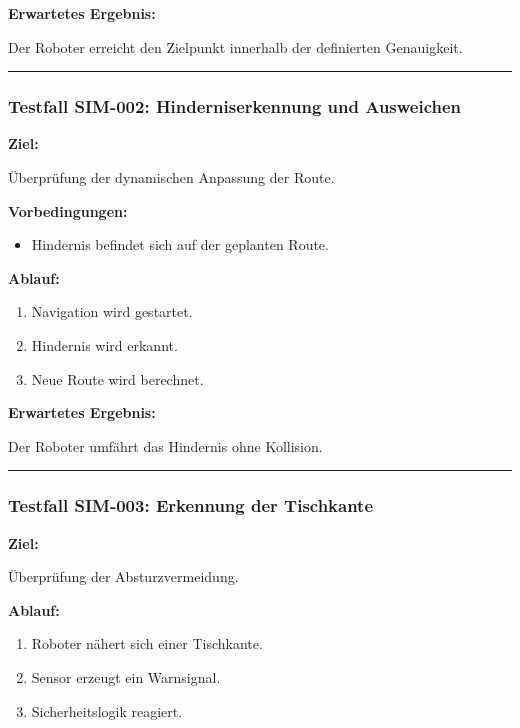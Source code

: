 \documentclass[
]{article}
\providecommand{\tightlist}{%
  \setlength{\itemsep}{0pt}\setlength{\parskip}{0pt}}
\begin{document}
\textbf{Erwartetes Ergebnis:}

Der Roboter erreicht den Zielpunkt innerhalb der definierten
Genauigkeit.

\begin{center}\rule{0.5\linewidth}{0.5pt}\end{center}

\subsubsection{Testfall SIM-002: Hinderniserkennung und
Ausweichen}\label{testfall-sim-002-hinderniserkennung-und-ausweichen}

\textbf{Ziel:}

Überprüfung der dynamischen Anpassung der Route.

\textbf{Vorbedingungen:}

\begin{itemize}
\tightlist
\item
  Hindernis befindet sich auf der geplanten Route.
\end{itemize}

\textbf{Ablauf:}

\begin{enumerate}
\def\labelenumi{\arabic{enumi}.}
\tightlist
\item
  Navigation wird gestartet.
\item
  Hindernis wird erkannt.
\item
  Neue Route wird berechnet.
\end{enumerate}

\textbf{Erwartetes Ergebnis:}

Der Roboter umfährt das Hindernis ohne Kollision.

\begin{center}\rule{0.5\linewidth}{0.5pt}\end{center}

\subsubsection{Testfall SIM-003: Erkennung der
Tischkante}\label{testfall-sim-003-erkennung-der-tischkante}

\textbf{Ziel:}

Überprüfung der Absturzvermeidung.

\textbf{Ablauf:}

\begin{enumerate}
\def\labelenumi{\arabic{enumi}.}
\tightlist
\item
  Roboter nähert sich einer Tischkante.
\item
  Sensor erzeugt ein Warnsignal.
\item
  Sicherheitslogik reagiert.
\end{enumerate}
\end{document}
